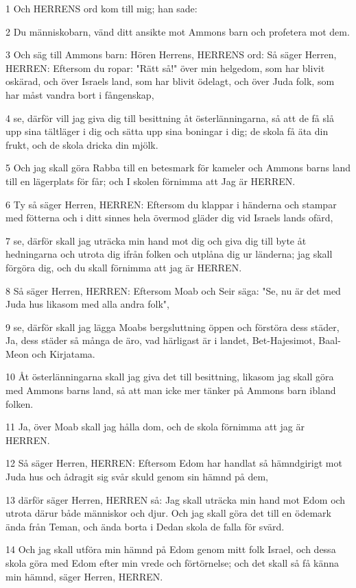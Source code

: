 \par 1 Och HERRENS ord kom till mig; han sade:
\par 2 Du människobarn, vänd ditt ansikte mot Ammons barn och profetera mot dem.
\par 3 Och säg till Ammons barn: Hören Herrens, HERRENS ord: Så säger Herren, HERREN: Eftersom du ropar: "Rätt så!" över min helgedom, som har blivit oskärad, och över Israels land, som har blivit ödelagt, och över Juda folk, som har måst vandra bort i fångenskap,
\par 4 se, därför vill jag giva dig till besittning åt österlänningarna, så att de få slå upp sina tältläger i dig och sätta upp sina boningar i dig; de skola få äta din frukt, och de skola dricka din mjölk.
\par 5 Och jag skall göra Rabba till en betesmark för kameler och Ammons barns land till en lägerplats för får; och I skolen förnimma att Jag är HERREN.
\par 6 Ty så säger Herren, HERREN: Eftersom du klappar i händerna och stampar med fötterna och i ditt sinnes hela övermod gläder dig vid Israels lands ofärd,
\par 7 se, därför skall jag uträcka min hand mot dig och giva dig till byte åt hedningarna och utrota dig ifrån folken och utplåna dig ur länderna; jag skall förgöra dig, och du skall förnimma att jag är HERREN.
\par 8 Så säger Herren, HERREN: Eftersom Moab och Seir säga: "Se, nu är det med Juda hus likasom med alla andra folk",
\par 9 se, därför skall jag lägga Moabs bergsluttning öppen och förstöra dess städer, Ja, dess städer så många de äro, vad härligast är i landet, Bet-Hajesimot, Baal-Meon och Kirjatama.
\par 10 Åt österlänningarna skall jag giva det till besittning, likasom jag skall göra med Ammons barns land, så att man icke mer tänker på Ammons barn ibland folken.
\par 11 Ja, över Moab skall jag hålla dom, och de skola förnimma att jag är HERREN.
\par 12 Så säger Herren, HERREN: Eftersom Edom har handlat så hämndgirigt mot Juda hus och ådragit sig svår skuld genom sin hämnd på dem,
\par 13 därför säger Herren, HERREN så: Jag skall uträcka min hand mot Edom och utrota därur både människor och djur. Och jag skall göra det till en ödemark ända från Teman, och ända borta i Dedan skola de falla för svärd.
\par 14 Och jag skall utföra min hämnd på Edom genom mitt folk Israel, och dessa skola göra med Edom efter min vrede och förtörnelse; och det skall så få känna min hämnd, säger Herren, HERREN.
